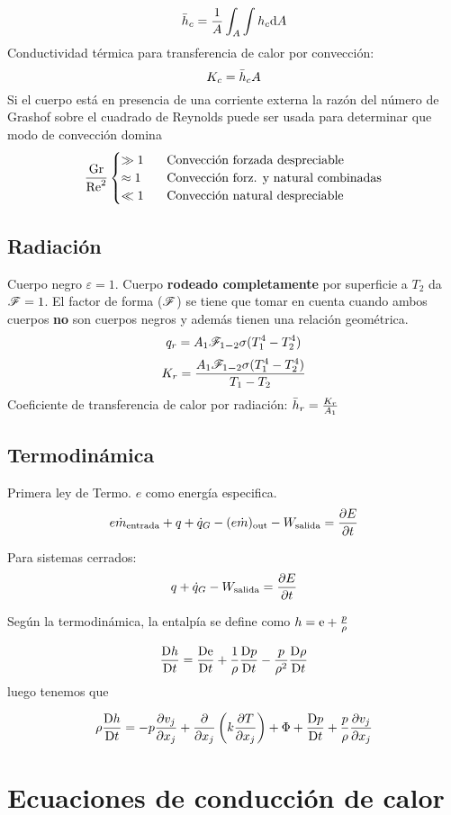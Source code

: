 $$\bar{h}_c=\frac{1}{A}\int_A\int h_c\textrm{d} A$$
Conductividad térmica para transferencia de calor por convección:
$$K_c=\bar{h}_c A$$
Si el cuerpo está en presencia de una corriente externa la razón del número de Grashof sobre el cuadrado de Reynolds puede ser usada para determinar que modo de convección domina
\[
\frac{\textrm{Gr}}{\textrm{Re}^2}
\begin{cases}
\gg 1&\quad \!\textrm{Convección forzada despreciable} \\
\approx  1&\quad\! \textrm{Convección forz. y natural combinadas}\\ 
\ll 1 & \quad \! \textrm{Convección natural despreciable}
\end{cases}
\]
\subsection{Radiación}
Cuerpo negro $\varepsilon=1$. Cuerpo \textbf{rodeado completamente} por superficie a $T_2$ da $\mathscr{F}=1$. El factor de forma ($\mathscr{F}$) se tiene que tomar en cuenta cuando ambos cuerpos \textbf{no} son cuerpos negros y además tienen una relación geométrica.
$$q_r=A_1\mathscr{F}_{1\boldsymbol{-}2}\sigma(T_1^4-T_2^4) $$
$$K_r=\frac{A_1\mathscr{F}_{1\boldsymbol{-}2} \sigma(T_1^4-T_2^4)}{T_1-T_2}$$
Coeficiente de transferencia de calor por radiación: $\bar{h}_r=\frac{K_r}{A_1}$
\subsection{Termodinámica}
Primera ley de Termo. $e$ como energía especifica.
$$e\dot{m}_\textrm{entrada}+q+\dot{q}_G-(e\dot{m})_\textrm{out}-W_{\textrm{salida}}=\frac{\partial E}{\partial t} $$

Para sistemas cerrados:
$$q+\dot{q}_G-W_{\textrm{salida}}=\frac{\partial E}{\partial t}$$

Según la termodinámica, la entalpía se define como $h=\textrm{e}+\frac{p}{\rho}$

$$\frac{\textrm{D} h}{\textrm{D} t}=\frac{\textrm{D} \textrm{e} }{\textrm{D} t}+\frac{1}{\rho}\frac{\textrm{D} p}{\textrm{D} t}- \frac{p}{\rho^2} \frac{\textrm{D} \rho}{\textrm{D} t} $$
luego tenemos que 

\begin{equation}\label{eq:entalpia}
    \rho \frac{\textrm{D} h}{\textrm{D} t} = -p\frac{\partial v_j}{\partial x_j} +\frac{\partial  }{\partial x_j}\left( k\frac{\partial T}{\partial x_j}\right) +\Phi +\frac{\textrm{D} p}{\textrm{D} t}+ \frac{p}{\rho} \frac{\partial v_j}{\partial x_j} 
\end{equation}
\section{Ecuaciones de conducción de calor}
